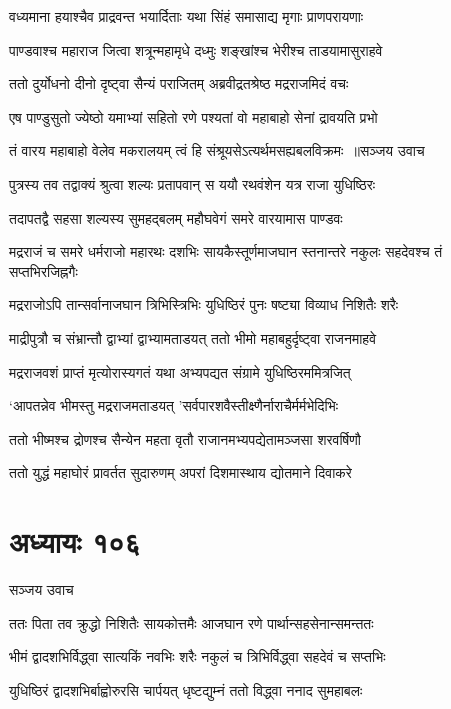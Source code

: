 \twolineshloka
{वध्यमाना हयाश्चैव प्राद्रवन्त भयार्दिताः}
{यथा सिंहं समासाद्य मृगाः प्राणपरायणाः}


\twolineshloka
{पाण्डवाश्च महाराज जित्वा शत्रून्महामृधे}
{दध्मुः शङ्खांश्च भेरीश्च ताडयामासुराहवे}


\twolineshloka
{ततो दुर्योधनो दीनो दृष्ट्वा सैन्यं पराजितम्}
{अब्रवीद्रतश्रेष्ठ मद्रराजमिदं वचः}


\twolineshloka
{एष पाण्डुसुतो ज्येष्ठो यमाभ्यां सहितो रणे}
{पश्यतां वो महाबाहो सेनां द्रावयति प्रभो}


\threelineshloka
{तं वारय महाबाहो वेलेव मकरालयम्}
{त्वं हि संश्रूयसेऽत्यर्थमसह्यबलविक्रमः ॥सञ्जय उवाच}
{}


\twolineshloka
{पुत्रस्य तव तद्वाक्यं श्रुत्वा शल्यः प्रतापवान्}
{स ययौ रथवंशेन यत्र राजा युधिष्ठिरः}


\twolineshloka
{तदापतद्वै सहसा शल्यस्य सुमहद्बलम्}
{महौघवेगं समरे वारयामास पाण्डवः}


\threelineshloka
{मद्रराजं च समरे धर्मराजो महारथः}
{दशभिः सायकैस्तूर्णमाजघान स्तनान्तरे}
{नकुलः सहदेवश्च तं सप्तभिरजिह्नगैः}


\twolineshloka
{मद्रराजोऽपि तान्सर्वानाजघान त्रिभिस्त्रिभिः}
{युधिष्ठिरं पुनः षष्ट्या विव्याध निशितैः शरैः}


\twolineshloka
{माद्रीपुत्रौ च संभ्रान्तौ द्वाभ्यां द्वाभ्यामताडयत्}
{ततो भीमो महाबहुर्दृष्ट्वा राजनमाहवे}


\twolineshloka
{मद्रराजवशं प्राप्तं मृत्योरास्यगतं यथा}
{अभ्यपद्यत संग्रामे युधिष्ठिरममित्रजित्}


\twolineshloka
{`आपतन्नेव भीमस्तु मद्रराजमताडयत्}
{'सर्वपारशवैस्तीक्ष्णैर्नाराचैर्मर्मभेदिभिः}


\twolineshloka
{ततो भीष्मश्च द्रोणश्च सैन्येन महता वृतौ}
{राजानमभ्यपद्येतामञ्जसा शरवर्षिणौ}


\twolineshloka
{ततो युद्धं महाघोरं प्रावर्तत सुदारुणम्}
{अपरां दिशमास्थाय द्योतमाने दिवाकरे}


\chapter{अध्यायः १०६}
\twolineshloka
{सञ्जय उवाच}
{}


\twolineshloka
{ततः पिता तव क्रुद्धो निशितैः सायकोत्तमैः}
{आजघान रणे पार्थान्सहसेनान्समन्ततः}


\twolineshloka
{भीमं द्वादशभिर्विद्ध्वा सात्यकिं नवभिः शरैः}
{नकुलं च त्रिभिर्विद्ध्वा सहदेवं च सप्तभिः}


\twolineshloka
{युधिष्ठिरं द्वादशभिर्बाह्वोरुरसि चार्पयत्}
{धृष्टद्युम्नं ततो विद्ध्वा ननाद सुमहाबलः}


